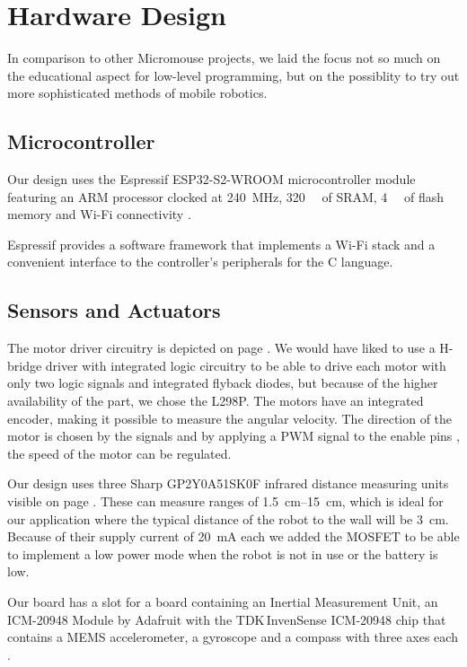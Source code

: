 \section{Hardware Design}
In comparison to other Micromouse projects, we laid the focus not so much on
the educational aspect for low-level programming, but on the possiblity to try
out more sophisticated methods of mobile robotics.

\subsection{Microcontroller}
Our design uses the Espressif ESP32-S2-WROOM microcontroller module
featuring an ARM processor clocked at \SI{240}{\mega\hertz},
\SI{320}{\kilo\byte} of SRAM, \SI{4}{\mega\byte} of flash memory and Wi-Fi
connectivity \cite{esp32-s2-wroom-datasheet}.

Espressif provides a software framework that implements a Wi-Fi stack and a
convenient interface to the controller's peripherals for the C language.
\subsection{Sensors and Actuators}
The motor driver circuitry is depicted on page \pageref{schematic:hbridge}.
We would have liked to use a H-bridge driver with integrated logic circuitry
to be able to drive each motor with only two logic signals and integrated
flyback diodes, but because of the higher availability of the part, we chose
the L298P.
The motors have an integrated encoder, making it possible to measure the
angular velocity.
The direction of the motor is chosen by the signals  and by
applying a PWM signal to the enable pins , the speed of the
motor can be regulated.

Our design uses three Sharp GP2Y0A51SK0F infrared distance measuring units
visible on page \pageref{schematic:ir}.
These can measure ranges of \SIrange{1.5}{15}{\centi\meter}, which is ideal for
our application where the typical distance of the robot to the wall will be
\SI{3}{\centi\meter}.
Because of their supply current of \SI{20}{\milli\ampere} each we added the
MOSFET  to be able to implement a low power mode when the robot is
not in use or the battery is low.

Our board has a slot for a board containing an Inertial Measurement Unit, an
ICM-20948 Module by Adafruit with the TDK\,InvenSense ICM-20948 chip that
contains a MEMS accelerometer, a gyroscope and a compass with three axes each
\cite{icm20948-datasheet}.

